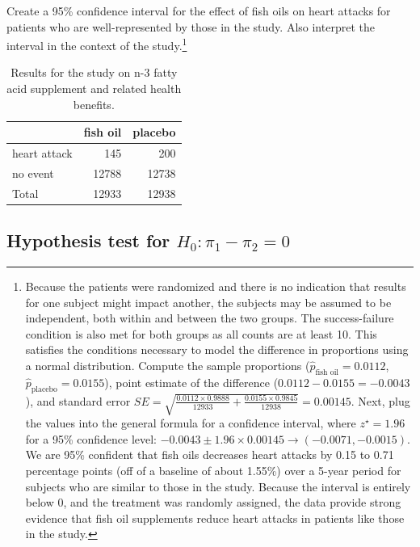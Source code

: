 \documentclass[
  10pt,
  openany]{book}
\theoremstyle{definition}
\theoremstyle{definition}
\theoremstyle{definition}
\theoremstyle{definition}
\theoremstyle{remark}
\begin{document}
Create a 95\% confidence interval for the effect of fish oils on heart attacks for patients who are well-represented by those in the study. Also interpret the interval in the context of the study.\footnote{Because the patients were randomized and there is no indication that results for one subject might impact another, the subjects may be assumed to be independent, both within and between the two groups. The success-failure condition is also met for both groups as all counts are at least 10. This satisfies the conditions necessary to model the difference in proportions using a normal distribution. Compute the sample proportions (\(\hat{p}_{\text{fish oil}} = 0.0112\), \(\hat{p}_{\text{placebo}} = 0.0155\)), point estimate of the difference (\(0.0112 - 0.0155 = -0.0043\)), and standard error \(SE = \sqrt{\frac{0.0112 \times 0.9888}{12933} + \frac{0.0155 \times 0.9845}{12938}} = 0.00145\). Next, plug the values into the general formula for a confidence interval, where \(z^{\star} = 1.96\) for a 95\% confidence level: \(-0.0043 \pm 1.96 \times 0.00145 \rightarrow (-0.0071, -0.0015)\). We are 95\% confident that fish oils decreases heart attacks by 0.15 to 0.71 percentage points (off of a baseline of about 1.55\%) over a 5-year period for subjects who are similar to those in the study. Because the interval is entirely below 0, and the treatment was randomly assigned, the data provide strong evidence that fish oil supplements reduce heart attacks in patients like those in the study.}

\begin{table}
\centering
\caption{\label{tab:fish-oil-data}Results for the study on n-3 fatty acid supplement and related health benefits.}
\centering
\begin{tabular}[t]{l|r|r}
\hline
  & fish oil & placebo\\
\hline
heart attack & 145 & 200\\
\hline
no event & 12788 & 12738\\
\hline
Total & 12933 & 12938\\
\hline
\end{tabular}
\end{table}

\subsection{\texorpdfstring{Hypothesis test for \(H_0: \pi_1 - \pi_2 = 0\)}{Hypothesis test for H\_0: \textbackslash pi\_1 - \textbackslash pi\_2 = 0}}\label{hypothesis-test-for-h_0-pi_1---pi_2-0}
\end{document}
